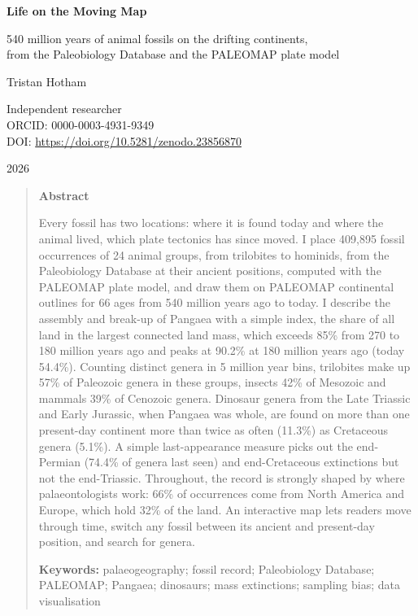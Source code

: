 \documentclass[11pt,a4paper]{article}
\begin{document}
\begin{center}
{\Large\bfseries Life on the Moving Map\par}
\vspace{0.4em}
{\large 540 million years of animal fossils on the drifting continents,\\from the Paleobiology Database and the PALEOMAP plate model\par}
\vspace{1.2em}
{\large Tristan Hotham\par}
\vspace{0.3em}
{\small Independent researcher\\
ORCID: 0000-0003-4931-9349\\
DOI: \href{https://doi.org/10.5281/zenodo.23856870}{https://doi.org/10.5281/zenodo.23856870}\par}
\vspace{0.8em}
2026
\end{center}

\begin{quote}
\small
\begin{center}\textbf{Abstract}\end{center}
Every fossil has two locations: where it is found today and where the animal lived, which plate tectonics has since moved. I place 409,895 fossil occurrences of 24 animal groups, from trilobites to hominids, from the Paleobiology Database at their ancient positions, computed with the PALEOMAP plate model, and draw them on PALEOMAP continental outlines for 66 ages from 540 million years ago to today. I describe the assembly and break-up of Pangaea with a simple index, the share of all land in the largest connected land mass, which exceeds 85\% from 270 to 180 million years ago and peaks at 90.2\% at 180 million years ago (today 54.4\%). Counting distinct genera in 5 million year bins, trilobites make up 57\% of Paleozoic genera in these groups, insects 42\% of Mesozoic and mammals 39\% of Cenozoic genera. Dinosaur genera from the Late Triassic and Early Jurassic, when Pangaea was whole, are found on more than one present-day continent more than twice as often (11.3\%) as Cretaceous genera (5.1\%). A simple last-appearance measure picks out the end-Permian (74.4\% of genera last seen) and end-Cretaceous extinctions but not the end-Triassic. Throughout, the record is strongly shaped by where palaeontologists work: 66\% of occurrences come from North America and Europe, which hold 32\% of the land. An interactive map lets readers move through time, switch any fossil between its ancient and present-day position, and search for genera.

\textbf{Keywords:} palaeogeography; fossil record; Paleobiology Database; PALEOMAP; Pangaea; dinosaurs; mass extinctions; sampling bias; data visualisation
\end{quote}
\end{document}
